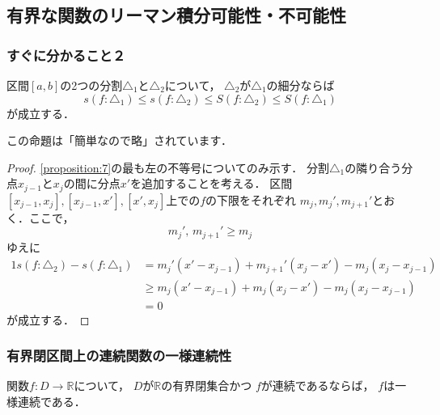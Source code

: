 \documentclass[./index]{subfiles}
\begin{document}
\setcounter{subsection}{3}
\subsection{有界な関数のリーマン積分可能性・不可能性}
\subsubsection{すぐに分かること２}
\begin{screen}
    \begin{proposition}
        区間$[a, b]$の2つの分割$\triangle_1$と$\triangle_2$について，
        $\triangle_2$が$\triangle_1$の細分ならば
        \begin{equation}
            s(f:\triangle_1) \leq s(f:\triangle_2) \leq S(f: \triangle_2) \leq S(f: \triangle_1)
            \label{proposition:7}
        \end{equation}
        が成立する．
    \end{proposition}
\end{screen}

この命題は「簡単なので略」されています．

\begin{proof}
    \cref{proposition:7}の最も左の不等号についてのみ示す．
    分割$\triangle_1$の隣り合う分点$x_{j-1}$と$x_{j}$の間に分点$x'$を追加することを考える．
    区間$[x_{j-1}, x_{j}], [x_{j-1}, x'], [x', x_j]$上での$f$の下限をそれぞれ
    $m_j, m_j', m_{j+1}'$とおく．ここで，
    \begin{equation}
        m_j',\, m_{j+1}' \geq m_j
    \end{equation}
    ゆえに
    \begin{alignat}{1}
        s(f:\triangle_2) - s(f:\triangle_1) &=
            m_j' (x' - x_{j-1}) + m_{j+1}' (x_j - x') - m_j (x_j - x_{j-1}) \\
        &\geq
            m_j (x' - x_{j-1}) + m_j (x_j - x') - m_j (x_j - x_{j-1}) \\
        &=
            0
    \end{alignat}
    が成立する．
\end{proof}

\subsubsection{有界閉区間上の連続関数の一様連続性}
\begin{screen}
    \begin{proposition}
        関数$f:D\rightarrow\mathbb{R}$について，
        $D$が$\mathbb{R}$の有界閉集合かつ
        $f$が連続であるならば，
        $f$は一様連続である．
    \end{proposition}
\end{screen}
\end{document}
